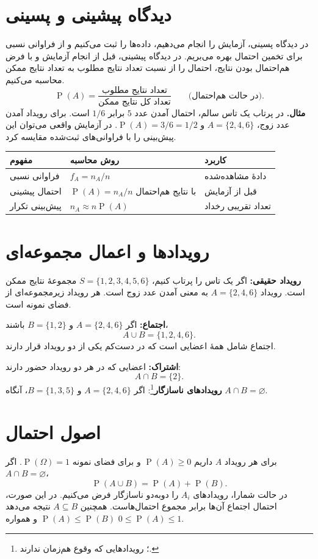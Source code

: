 \documentclass[12pt,a4paper,oneside]{book}
\newcommand{\Prob}{\operatorname{P}}
\begin{document}
\section{دیدگاه پیشینی و پسینی}
در دیدگاه پسینی، آزمایش را انجام می‌دهیم، داده‌ها را ثبت می‌کنیم و از فراوانی نسبی برای تخمین احتمال بهره می‌بریم. در دیدگاه پیشینی، قبل از انجام آزمایش و با فرض هم‌احتمال بودن نتایج، احتمال را از نسبت تعداد نتایج مطلوب به تعداد نتایج ممکن محاسبه می‌کنیم.
\begin{equation}\Prob(A)=\frac{\text{تعداد نتایج مطلوب}}{\text{تعداد کل نتایج ممکن}}\qquad\text{(در حالت هم‌احتمال)}.\end{equation}
\textbf{مثال.} در پرتاب یک تاس سالم، احتمال آمدن عدد $5$ برابر $1/6$ است. برای رویداد آمدن عدد زوج، $A=\{2,4,6\}$ و $\Prob(A)=3/6=1/2$. در آزمایش واقعی می‌توان این پیش‌بینی را با فراوانی‌های ثبت‌شده مقایسه کرد.

\begin{center}\small
\begin{tabular}{p{34mm}p{61mm}p{37mm}}\toprule
مفهوم & روش محاسبه & کاربرد \\ \midrule
فراوانی نسبی & $f_A=n_A/n$ & دادهٔ مشاهده‌شده \\
احتمال پیشینی & $\Prob(A)=n_A/n$ با نتایج هم‌احتمال & قبل از آزمایش \\
پیش‌بینی تکرار & $n_A\approx n\Prob(A)$ & تعداد تقریبی رخداد \\ \bottomrule
\end{tabular}\end{center}

\section{رویدادها و اعمال مجموعه‌ای}
\textbf{رویداد حقیقی:} اگر یک تاس را پرتاب کنیم، $S=\{1,2,3,4,5,6\}$ مجموعهٔ نتایج ممکن است. رویداد $A=\{2,4,6\}$ به معنی آمدن عدد زوج است. هر رویداد زیرمجموعه‌ای از فضای نمونه است.

\textbf{اجتماع:} اگر $A=\{2,4,6\}$ و $B=\{1,2\}$ باشند،
\[A\cup B=\{1,2,4,6\}.\]
اجتماع شامل همهٔ اعضایی است که در دست‌کم یکی از دو رویداد قرار دارند.

\textbf{اشتراک:} اعضایی که در هر دو رویداد حضور دارند:
\[A\cap B=\{2\}.\]
\textbf{رویدادهای ناسازگار}\footnote{؛ رویدادهایی که وقوع هم‌زمان ندارند.}:
اگر $A=\{2,4,6\}$ و $B=\{1,3,5\}$، آنگاه $A\cap B=\varnothing$.

\section{اصول احتمال}
برای هر رویداد $A$ داریم $\Prob(A)\geq0$ و برای فضای نمونه $\Prob(\Omega)=1$. اگر $A\cap B=\varnothing$،
\begin{equation}\Prob(A\cup B)=\Prob(A)+\Prob(B).\end{equation}
در حالت شمارا، رویدادهای $A_i$ را دوبه‌دو ناسازگار فرض می‌کنیم. در این صورت، احتمال اجتماع آن‌ها برابر مجموع احتمال‌هاست. همچنین $A\subseteq B$ نتیجه می‌دهد $\Prob(A)\leq\Prob(B)$ و همواره $0\leq\Prob(A)\leq1$.
\end{document}
